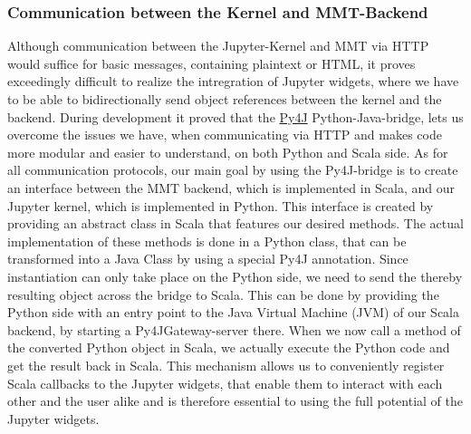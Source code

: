 \subsubsection{Communication between the Kernel and MMT-Backend}
Although communication between the Jupyter-Kernel and MMT via HTTP would suffice for basic messages, containing plaintext or HTML, it proves exceedingly difficult to realize the intregration of Jupyter widgets, where we have to be able to bidirectionally send object references between the kernel and the backend. During development it proved that the \hyperlink{https://www.py4j.org/}{Py4J} Python-Java-bridge, lets us overcome the issues we have, when communicating via HTTP and makes code more modular and easier to understand, on both Python and Scala side. As for all communication protocols, our main goal by using the Py4J-bridge is to create an interface between the MMT backend, which is implemented in Scala, and our Jupyter kernel, which is implemented in Python. This interface is created by providing an abstract class in Scala that features our desired methods. The actual implementation of these methods is done in a Python class, that can be transformed into a Java Class by using a special Py4J annotation. Since instantiation can only take place on the Python side, we need to send the thereby resulting object across the bridge to Scala. This can be done by providing the Python side with an entry point to the Java Virtual Machine (JVM) of our Scala backend, by starting a Py4JGateway-server there. When we now call a method of the converted Python object in Scala, we actually execute the Python code and get the result back in Scala. This mechanism allows us to conveniently register Scala callbacks to the Jupyter widgets, that enable them to interact with each other and the user alike and is therefore essential to using the full potential of the Jupyter widgets.



